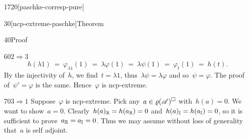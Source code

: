 \begin{parsec}{1720}[paschke-corresp-pure]
\begin{point}{30}[ncp-extreme-paschke]{Theorem}
\begin{point}{40}{Proof}
\begin{point}{60}{$2 \Rightarrow 3$}
\begin{equation*}
    h(\lambda 1)
    \ =\  \varphi_{\lambda1}(1) \ =\  \lambda \varphi(1) 
    \ =\  \lambda \psi(1)
    \ =\  \varphi_t (1)  \ =\  h(t).
\end{equation*}
By the injectivity of~$h$,
    we find~$t = \lambda 1$,
    thus~$\lambda \psi = \lambda \varphi$
    and so~$\psi = \varphi$.
The proof of~$\psi' = \varphi$ is the same.
Hence~$\varphi$ is ncp-extreme.
\end{point}
\begin{point}{70}{$3 \Rightarrow 1$}%
Suppose~$\varphi$ is ncp-extreme.
Pick any~$a \in \varrho(\mathscr{A})^\square$ with~$h(a) = 0$.
We want to show~$a = 0$.
Clearly~$h(a)_{\mathbb{R}} = h(a_{\mathbb{R}}) = 0$
and~$h(a)_{\mathbb{I}} = h(a_{\mathbb{I}}) = 0$,
so it is sufficient to prove~$a_{\mathbb{R}} = a_{\mathbb{I}}=0$.
Thus we may assume without loss of generality that~$a$ is self adjoint.


\end{point}
\end{point}
\end{point}
\end{parsec}
